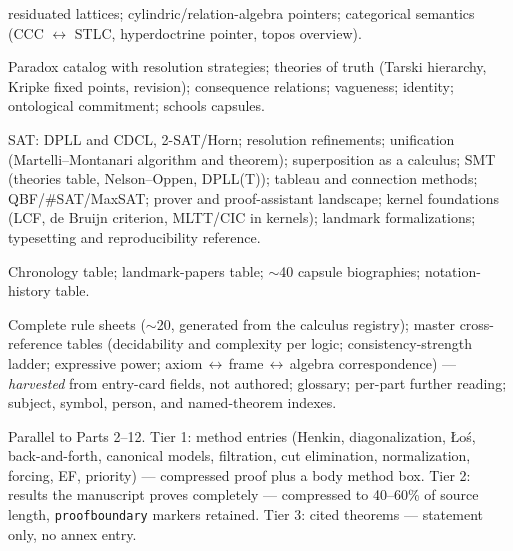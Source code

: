 \documentclass[11pt,letterpaper]{article}
\begin{document}
\begin{description}[style=nextline]
    residuated lattices; cylindric/relation-algebra pointers;
    categorical semantics (CCC $\leftrightarrow$ STLC, hyperdoctrine
    pointer, topos overview).
  \item[Part 11 --- Philosophy of Logic.]
    Paradox catalog with resolution strategies; theories of truth
    (Tarski hierarchy, Kripke fixed points, revision); consequence
    relations; vagueness; identity; ontological commitment; schools
    capsules.
  \item[Part 12 --- Automation and Mechanization.]
    SAT: DPLL and CDCL, 2-SAT/Horn; resolution refinements;
    unification (Martelli--Montanari algorithm and theorem);
    superposition as a calculus; SMT (theories table, Nelson--Oppen,
    DPLL(T)); tableau and connection methods; QBF/\#SAT/MaxSAT;
    prover and proof-assistant landscape; kernel foundations (LCF,
    de Bruijn criterion, MLTT/CIC in kernels); landmark
    formalizations; typesetting and reproducibility reference.
  \item[Part 13 --- Chronology and Biography.]
    Chronology table; landmark-papers table; $\sim$40 capsule
    biographies; notation-history table.
  \item[Part 14 --- Apparatus.]
    Complete rule sheets ($\sim$20, generated from the calculus
    registry); master cross-reference tables (decidability and
    complexity per logic; consistency-strength ladder; expressive
    power; axiom$\,\leftrightarrow\,$frame$\,\leftrightarrow\,$algebra
    correspondence) --- \emph{harvested} from entry-card fields, not
    authored; glossary; per-part further reading; subject, symbol,
    person, and named-theorem indexes.
  \item[Appendix P --- Proof Annex.]
    Parallel to Parts 2--12.  Tier 1: method entries (Henkin,
    diagonalization, \L o\'s, back-and-forth, canonical models,
    filtration, cut elimination, normalization, forcing, EF, priority)
    --- compressed proof plus a body method box.  Tier 2: results the
    manuscript proves completely --- compressed to 40--60\% of source
    length, \texttt{proofboundary} markers retained.  Tier 3: cited
    theorems --- statement only, no annex entry.
\end{description}
\end{document}
